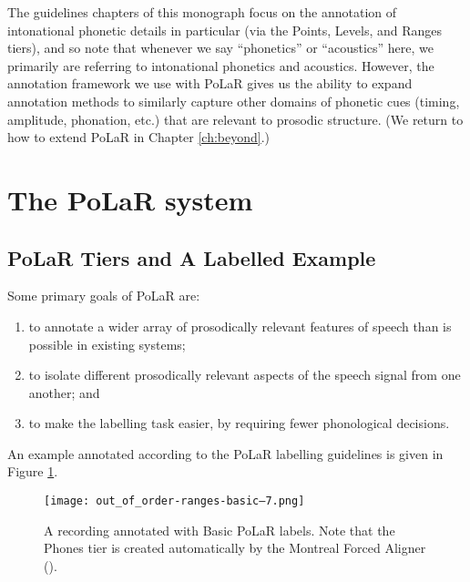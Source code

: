 The guidelines chapters of this monograph focus on the annotation of intonational phonetic details in particular (via the Points, Levels, and Ranges tiers), and so note that whenever we say “phonetics” or “acoustics” here, we primarily are referring to intonational phonetics and acoustics.  However, the annotation framework we use with PoLaR gives us the ability to expand annotation methods to similarly capture other domains of phonetic cues (timing, amplitude, phonation, etc.) that are relevant to prosodic structure. (We return to how to extend PoLaR in Chapter \ref{ch:beyond}.)

\section{The PoLaR system}\label{sec:polar-system}

\subsection{PoLaR Tiers and A Labelled Example}\label{sec:polar-tiers-and-a-labelled-example}

Some primary goals of PoLaR are:

\begin{enumerate}
\item to annotate a wider array of prosodically relevant features of speech than is possible in existing systems;
\item to isolate different prosodically relevant aspects of the speech signal from one another; and
\item to make the labelling task easier, by requiring fewer phonological decisions.
\end{enumerate}

An example annotated according to the PoLaR labelling guidelines is given in Figure \ref{fig:PoLaR 1st basic}.

\begin{figure}[H]
\centering
%
\texttt{[image: out\_of\_order-ranges-basic--7.png]}
%
\caption{A recording annotated with Basic PoLaR labels. Note that the Phones tier is created automatically by the Montreal Forced Aligner (\citealt{mcauliffe-19}).\protect\footnotemark%
\label{fig:PoLaR 1st basic}%
}
\end{figure}


